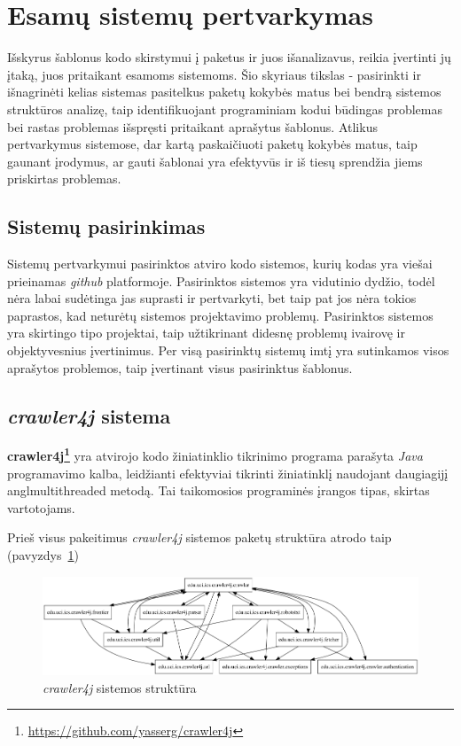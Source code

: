 \section{Esamų sistemų pertvarkymas}
Išskyrus šablonus kodo skirstymui į paketus ir juos išanalizavus, reikia įvertinti jų įtaką, juos pritaikant esamoms sistemoms.
Šio skyriaus tikslas - pasirinkti ir išnagrinėti kelias sistemas pasitelkus paketų kokybės matus bei bendrą sistemos struktūros analizę,
taip identifikuojant programiniam kodui būdingas problemas bei rastas problemas išspręsti pritaikant aprašytus šablonus.
Atlikus pertvarkymus sistemose, dar kartą paskaičiuoti paketų kokybės matus,
taip gaunant įrodymus, ar gauti šablonai yra efektyvūs ir iš tiesų sprendžia
jiems priskirtas problemas.


\subsection{Sistemų pasirinkimas}
Sistemų pertvarkymui pasirinktos atviro kodo sistemos, kurių kodas yra viešai prieinamas \textit{github} platformoje.
Pasirinktos sistemos yra vidutinio dydžio, todėl nėra labai sudėtinga jas suprasti ir pertvarkyti, bet taip pat jos nėra
tokios paprastos, kad neturėtų sistemos projektavimo problemų.
Pasirinktos sistemos yra skirtingo tipo projektai, taip užtikrinant didesnę problemų ivairovę ir objektyvesnius įvertinimus.
Per visą pasirinktų sistemų imtį yra sutinkamos visos aprašytos problemos, taip įvertinant visus pasirinktus šablonus.

\subsection{\textit{crawler4j} sistema}
\textbf{crawler4j\footnote{\url{https://github.com/yasserg/crawler4j}}} yra atvirojo kodo
žiniatinklio tikrinimo  programa parašyta \textit{Java} programavimo kalba, leidžianti
efektyviai tikrinti žiniatinklį naudojant daugiagijį angl{multithreaded} metodą.
Tai taikomosios programinės įrangos tipas, skirtas vartotojams.

Prieš visus pakeitimus \textit{crawler4j} sistemos paketų struktūra atrodo taip (pavyzdys~\ref{fig:crawler_packages_orig})
\begin{figure}[H]
    \centering
    \includegraphics[scale=0.5]{img/crawler_packages_orig}
    \caption{\textit{crawler4j} sistemos struktūra}
    \label{fig:crawler_packages_orig}
\end{figure}


